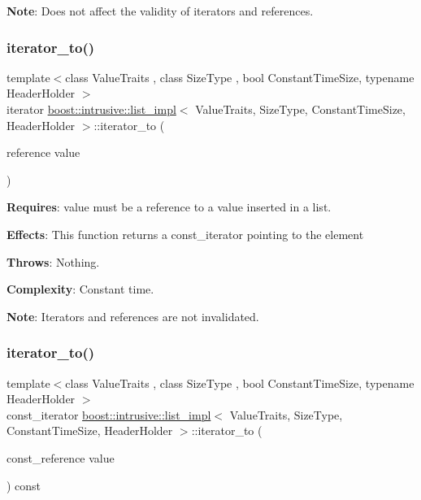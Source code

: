 {\bfseries Note}\+: Does not affect the validity of iterators and references. \mbox{\label{classboost_1_1intrusive_1_1list__impl_a51dd273b7b1163b87030157a59189a9e}} 
\subsubsection{\texorpdfstring{iterator\+\_\+to()}{iterator\_to()}\hspace{0.1cm}{\footnotesize\ttfamily [1/2]}}
{\footnotesize\ttfamily template$<$class Value\+Traits , class Size\+Type , bool Constant\+Time\+Size, typename Header\+Holder $>$ \\
iterator \hyperlink{classboost_1_1intrusive_1_1list__impl}{boost\+::intrusive\+::list\+\_\+impl}$<$ Value\+Traits, Size\+Type, Constant\+Time\+Size, Header\+Holder $>$\+::iterator\+\_\+to (\begin{DoxyParamCaption}\item[{reference}]{value }\end{DoxyParamCaption})\hspace{0.3cm}{\ttfamily [inline]}}

{\bfseries Requires}\+: value must be a reference to a value inserted in a list.

{\bfseries Effects}\+: This function returns a const\+\_\+iterator pointing to the element

{\bfseries Throws}\+: Nothing.

{\bfseries Complexity}\+: Constant time.

{\bfseries Note}\+: Iterators and references are not invalidated. \mbox{\label{classboost_1_1intrusive_1_1list__impl_a67a906c22bb2ca0a9ddfc60224f5d8ba}} 
\subsubsection{\texorpdfstring{iterator\+\_\+to()}{iterator\_to()}\hspace{0.1cm}{\footnotesize\ttfamily [2/2]}}
{\footnotesize\ttfamily template$<$class Value\+Traits , class Size\+Type , bool Constant\+Time\+Size, typename Header\+Holder $>$ \\
const\+\_\+iterator \hyperlink{classboost_1_1intrusive_1_1list__impl}{boost\+::intrusive\+::list\+\_\+impl}$<$ Value\+Traits, Size\+Type, Constant\+Time\+Size, Header\+Holder $>$\+::iterator\+\_\+to (\begin{DoxyParamCaption}\item[{const\+\_\+reference}]{value }\end{DoxyParamCaption}) const\hspace{0.3cm}{\ttfamily [inline]}}

